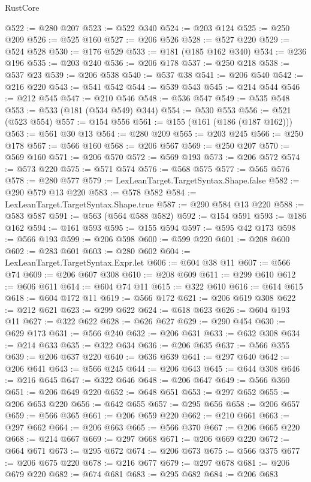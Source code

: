 \begin{lexlean}{RustCore}
\begin{coremodule}
@522 := @280 @207
@523 := @522 @340
@524 := @203 @124
@525 := @250 @209
@526 := @525 @160
@527 := @206 @526
@528 := @527 @220
@529 := @524 @528
@530 := @176 @529
@533 := @181 (@185 @162 @340)
@534 := @236 @196
@535 := @203 @240
@536 := @206 @178
@537 := @250 @218
@538 := @537 @23
@539 := @206 @538
@540 := @537 @38
@541 := @206 @540
@542 := @216 @220
@543 := @541 @542
@544 := @539 @543
@545 := @214 @544
@546 := @212 @545
@547 := @210 @546
@548 := @536 @547
@549 := @535 @548
@553 := @533 (@181 (@534 @549) @344)
@554 := @530 @553
@556 := @521 (@523 @554)
@557 := @154 @556
@561 := @155 (@161 (@186 (@187 @162)))
@563 := @561 @30 @13
@564 := @280 @209
@565 := @203 @245
@566 := @250 @178
@567 := @566 @160
@568 := @206 @567
@569 := @250 @207
@570 := @569 @160
@571 := @206 @570
@572 := @569 @193
@573 := @206 @572
@574 := @573 @220
@575 := @571 @574
@576 := @568 @575
@577 := @565 @576
@578 := @280 @577
@579 := LexLeanTarget.TargetSyntax.Shape.false
@582 := @290 @579 @13 @220
@583 := @578 @582
@584 := LexLeanTarget.TargetSyntax.Shape.true
@587 := @290 @584 @13 @220
@588 := @583 @587
@591 := @563 (@564 @588 @582)
@592 := @154 @591
@593 := @186 @162
@594 := @161 @593
@595 := @155 @594
@597 := @595 @42 @173
@598 := @566 @193
@599 := @206 @598
@600 := @599 @220
@601 := @208 @600
@602 := @283 @601
@603 := @280 @602
@604 := LexLeanTarget.TargetSyntax.Expr.let
@606 := @604 @38 @11
@607 := @566 @74
@609 := @206 @607 @308
@610 := @208 @609
@611 := @299 @610
@612 := @606 @611
@614 := @604 @74 @11
@615 := @322 @610
@616 := @614 @615
@618 := @604 @172 @11
@619 := @566 @172
@621 := @206 @619 @308
@622 := @212 @621
@623 := @299 @622
@624 := @618 @623
@626 := @604 @193 @11
@627 := @322 @622
@628 := @626 @627
@629 := @290 @454
@630 := @629 @173
@631 := @566 @240
@632 := @206 @631
@633 := @632 @308
@634 := @214 @633
@635 := @322 @634
@636 := @206 @635
@637 := @566 @355
@639 := @206 @637 @220
@640 := @636 @639
@641 := @297 @640
@642 := @206 @641
@643 := @566 @245
@644 := @206 @643
@645 := @644 @308
@646 := @216 @645
@647 := @322 @646
@648 := @206 @647
@649 := @566 @360
@651 := @206 @649 @220
@652 := @648 @651
@653 := @297 @652
@655 := @206 @653 @220
@656 := @642 @655
@657 := @295 @656
@658 := @206 @657
@659 := @566 @365
@661 := @206 @659 @220
@662 := @210 @661
@663 := @297 @662
@664 := @206 @663
@665 := @566 @370
@667 := @206 @665 @220
@668 := @214 @667
@669 := @297 @668
@671 := @206 @669 @220
@672 := @664 @671
@673 := @295 @672
@674 := @206 @673
@675 := @566 @375
@677 := @206 @675 @220
@678 := @216 @677
@679 := @297 @678
@681 := @206 @679 @220
@682 := @674 @681
@683 := @295 @682
@684 := @206 @683

\end{coremodule}
\end{lexlean}
